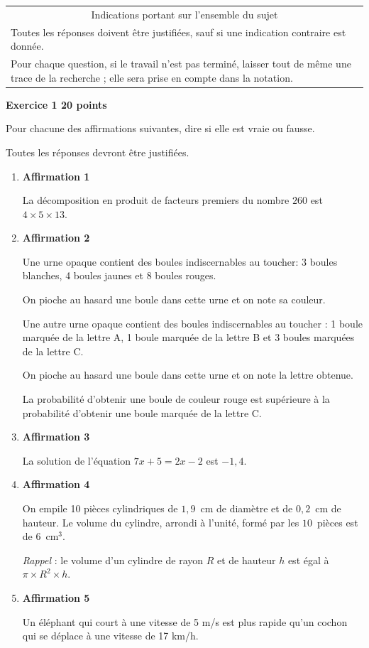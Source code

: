 \documentclass[11pt]{article}
\begin{document}
\begin{tabularx}{\linewidth}{|X|}\hline
\multicolumn{1}{|c|}{Indications portant sur l'ensemble du sujet}\\
Toutes les réponses doivent être justifiées, sauf si une indication contraire est donnée.\\
Pour chaque question, si le travail n'est pas terminé, laisser tout de même une trace de la recherche ; elle sera prise en compte dans la notation.\\ \hline
\end{tabularx}

\bigskip

{\large \textbf{Exercice 1 \hfill 20 points}}

\medskip

Pour chacune des affirmations suivantes, dire si elle est vraie ou fausse.

Toutes les réponses devront être justifiées.

\medskip

\begin{enumerate}
\item \textbf{Affirmation 1}

La décomposition en produit de facteurs premiers du nombre $260$ est $4 \times 5 \times 13$.
\item \textbf{Affirmation 2}

Une urne opaque contient des boules indiscernables au toucher: 3 boules blanches, 4 boules jaunes et 8 boules rouges.

On pioche au hasard une boule dans cette urne et on note sa couleur.

Une autre urne opaque contient des boules indiscernables au toucher : 1 boule marquée de la lettre A, 1 boule marquée de la lettre B et 3 boules marquées de la lettre C.

On pioche au hasard une boule dans cette urne et on note la lettre obtenue.

La probabilité d'obtenir une boule de couleur rouge est supérieure à la probabilité d'obtenir une boule marquée de la lettre C.
\item \textbf{Affirmation 3}

La solution de l'équation $7x + 5 = 2x - 2$ est $-1,4$.
\item \textbf{Affirmation 4}

On empile 10 pièces cylindriques de $1,9$~cm de diamètre et de $0,2$~cm de hauteur. Le volume du cylindre, arrondi à l'unité, formé par les $10$~pièces est de $6$~cm$^3$.

\emph{Rappel} : le volume d'un cylindre de rayon $R$ et de hauteur $h$ est égal à $\pi \times R^2 \times h$.
\item \textbf{Affirmation 5}

Un éléphant qui court à une vitesse de 5 m/s est plus rapide qu'un cochon qui se déplace à une vitesse de 17 km/h.
\end{enumerate}
\end{document}
